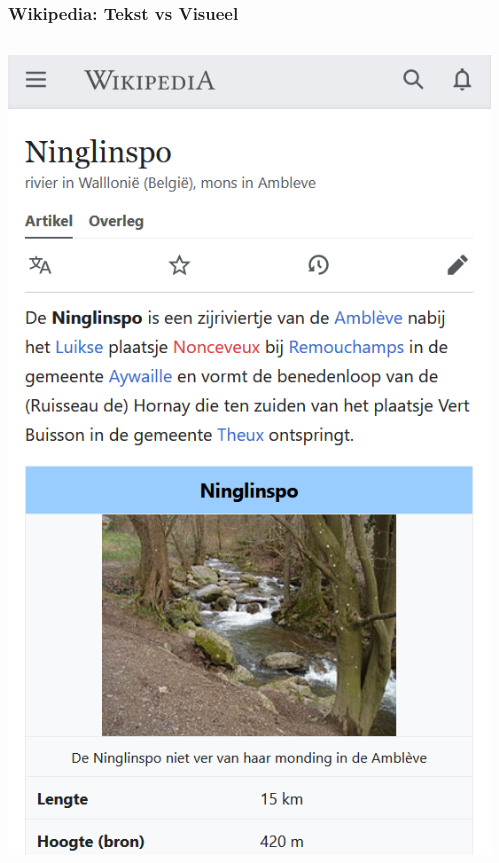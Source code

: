\documentclass[../presentatie.tex]{subfiles}
\begin{document}
    \begin{frame}
        \frametitle{Wikipedia: Tekst vs Visueel}
        \begin{columns}
            \begin{column}{0.4\textwidth}
                \includegraphics[width=\linewidth,height=0.85\textheight,keepaspectratio]{assets/wikipediaVisual}
            \end{column}
            \begin{column}{0.6\textwidth}
                

\end{column}
\end{columns}
\end{frame}
\end{document}
